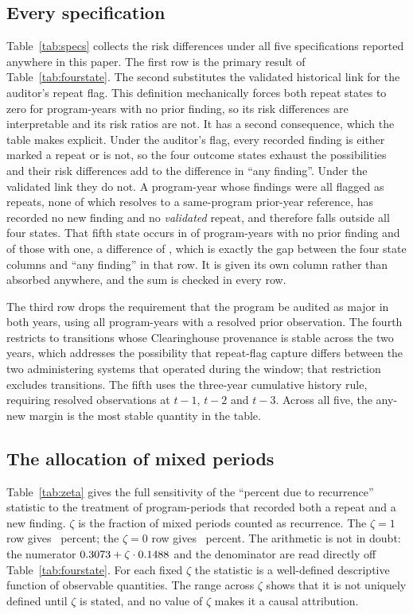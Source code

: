 \subsection{Every specification}

Table~\ref{tab:specs} collects the risk differences under all five
specifications reported anywhere in this paper. The first row is the primary
result of Table~\ref{tab:fourstate}. The second substitutes the validated
historical link for the auditor's repeat flag. This definition mechanically
forces both repeat states to zero for program-years with no prior finding, so
its risk differences are interpretable and its risk ratios are not. It has a
second consequence, which the table makes explicit. Under the auditor's flag,
every recorded finding is either marked a repeat or is not, so the four
outcome states exhaust the possibilities and their risk differences add to the
difference in ``any finding''. Under the validated link they do not. A
program-year whose findings were all flagged as repeats, none of which
resolves to a same-program prior-year reference, has recorded no new finding
and no \emph{validated} repeat, and therefore falls outside all four states.
That fifth state occurs in \nVlinkFifthNoPrior{} of program-years with no
prior finding and \nVlinkFifthPrior{} of those with one, a difference of
\nVlinkFifth{}, which is exactly the gap between the four state columns and
``any finding'' in that row. It is given its own column rather than absorbed
anywhere, and the sum is checked in every row.

The third row drops the requirement that the program be audited as major in
both years, using all program-years with a resolved prior observation. The
fourth restricts to transitions whose Clearinghouse provenance is stable across
the two years, which addresses the possibility that repeat-flag capture differs
between the two administering systems that operated during the window; that
restriction excludes \nProvExcluded{} transitions. The fifth uses the
three-year cumulative history rule, requiring resolved observations at $t-1$,
$t-2$ and $t-3$. Across all five, the any-new margin is the most stable
quantity in the table.

\subsection{The allocation of mixed periods}

Table~\ref{tab:zeta} gives the full sensitivity of the ``percent due to
recurrence'' statistic to the treatment of program-periods that recorded both a
repeat and a new finding. $\zeta$ is the fraction of mixed periods counted as
recurrence. The $\zeta = 1$ row gives \nNineZeroNine{}~percent; the $\zeta = 0$
row gives \nZetaLo{}~percent. The arithmetic is not in doubt: the numerator
$0.3073{} + \zeta \cdot 0.1488{}$ and the denominator \nDAny{} are read
directly off Table~\ref{tab:fourstate}. For each fixed $\zeta$ the statistic
is a well-defined descriptive function of observable quantities. The range
across $\zeta$ shows that it is not uniquely defined until $\zeta$ is stated,
and no value of $\zeta$ makes it a causal attribution.

